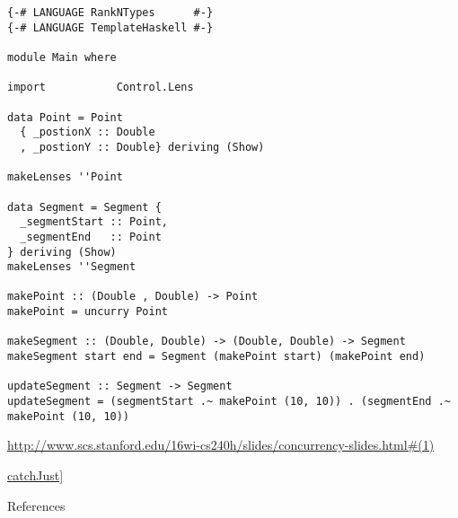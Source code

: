 \begin{verbatim}
{-# LANGUAGE RankNTypes      #-}
{-# LANGUAGE TemplateHaskell #-}

module Main where

import           Control.Lens

data Point = Point
  { _postionX :: Double
  , _postionY :: Double} deriving (Show)

makeLenses ''Point

data Segment = Segment {
  _segmentStart :: Point,
  _segmentEnd   :: Point
} deriving (Show)
makeLenses ''Segment

makePoint :: (Double , Double) -> Point
makePoint = uncurry Point

makeSegment :: (Double, Double) -> (Double, Double) -> Segment
makeSegment start end = Segment (makePoint start) (makePoint end)

updateSegment :: Segment -> Segment
updateSegment = (segmentStart .~ makePoint (10, 10)) . (segmentEnd .~ makePoint (10, 10))
\end{verbatim}



\url{http://www.scs.stanford.edu/16wi-cs240h/slides/concurrency-slides.html#(1)}

\href{https://hackage.haskell.org/package/base-4.10.0.0/docs/Control-Exception.html#v:catchJust}{catchJust]}


References


